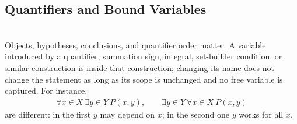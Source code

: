\subsection{Quantifiers and Bound Variables}

\begin{principle} \label{princ:analysis-language-as-structure} \\
Objects, hypotheses, conclusions, and quantifier order matter. A variable introduced by a quantifier, summation sign, integral, set-builder condition, or similar construction is  inside that construction; changing its name does not change the statement as long as its scope is unchanged and no free variable is captured. For instance,
\begin{align}
\forall x\in X\ \exists y\in Y\ P(x,y), \qquad
\exists y\in Y\ \forall x\in X\ P(x,y) \nonumber
\end{align}
are different: in the first $y$ may depend on $x$; in the second one $y$ works for all $x$.
\end{principle}

